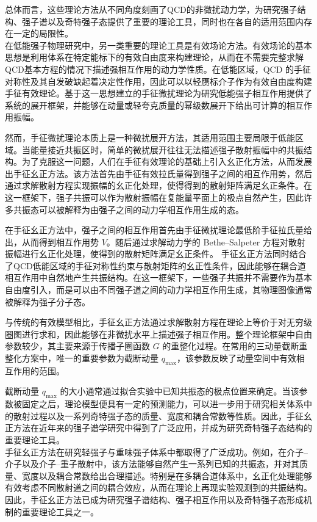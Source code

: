 总体而言，这些理论方法从不同角度刻画了QCD的非微扰动力学，为研究强子结构、强子谱以及奇特强子态提供了重要的理论工具，同时也在各自的适用范围内存在一定的局限性。\\

在低能强子物理研究中，另一类重要的理论工具是有效场论方法。有效场论的基本思想是利用体系在特定能标下的有效自由度来构建理论，从而在不需要完整求解QCD基本方程的情况下描述强相互作用的动力学性质。在低能区域，QCD 的手征对称性及其自发破缺起着决定性作用，因此可以以轻赝标介子作为有效自由度构建手征有效理论。基于这一思想建立的手征微扰理论为研究低能强子相互作用提供了系统的展开框架，并能够在动量或轻夸克质量的幂级数展开下给出可计算的相互作用振幅。

然而，手征微扰理论本质上是一种微扰展开方法，其适用范围主要局限于低能区域。当能量接近共振区时，简单的微扰展开往往无法描述强子散射振幅中的共振结构。为了克服这一问题，人们在手征有效理论的基础上引入幺正化方法，从而发展出手征幺正方法。该方法首先由手征有效拉氏量得到强子之间的相互作用势，然后通过求解散射方程实现振幅的幺正化处理，使得得到的散射矩阵满足幺正条件。在这一框架下，强子共振可以作为散射振幅在复能量平面上的极点自然产生，因此许多共振态可以被解释为由强子之间的动力学相互作用生成的态。

在手征幺正方法中，强子之间的相互作用首先由手征微扰理论最低阶手征拉氏量给出，从而得到相互作用势 $V$。随后通过求解动力学的 Bethe--Salpeter 方程对散射振幅进行幺正化处理，使得到的散射矩阵满足幺正条件。
手征幺正方法同时结合了QCD低能区域的手征对称性约束与散射矩阵的幺正性条件，因此能够在耦合道相互作用中自然地产生共振结构。在这一框架下，一些强子共振并不需要作为基本自由度引入，而是可以由不同强子道之间的动力学相互作用生成，其物理图像通常被解释为强子分子态。

与传统的有效模型相比，手征幺正方法通过求解散射方程在理论上等价于对无穷级圈图进行求和，因此能够在非微扰水平上描述强子相互作用。整个理论框架中自由参数较少，其主要来源于传播子圈函数 $G$ 的重整化过程。在常用的三动量截断重整化方案中，唯一的重要参数为截断动量 $q_{\text{max}}$，该参数反映了动量空间中有效相互作用的范围。

截断动量 $q_{\text{max}}$ 的大小通常通过拟合实验中已知共振态的极点位置来确定。当该参数被固定之后，理论模型便具有一定的预测能力，可以进一步用于研究相关体系中的散射过程以及一系列奇特强子态的质量、宽度和耦合常数等性质。因此，手征幺正方法在近年来的强子谱学研究中得到了广泛应用，并成为研究奇特强子态结构的重要理论工具。\\

手征幺正方法在研究轻强子与重味强子体系中都取得了广泛成功。例如，在介子–介子以及介子–重子散射中，该方法能够自然产生一系列已知的共振态，并对其质量、宽度以及耦合常数给出合理描述。特别是在多耦合道体系中，幺正化处理能够有效考虑不同散射道之间的耦合效应，从而在理论上再现实验观测到的共振结构。因此，手征幺正方法已成为研究强子谱结构、强子相互作用以及奇特强子态形成机制的重要理论工具之一。


